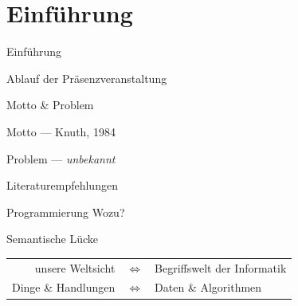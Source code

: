 \section{Einführung}\label{sec:0-einfuehrung}
\begin{frame}{Einführung}
\end{frame}

\begin{frame}{Ablauf der Präsenzveranstaltung}
\end{frame}

\begin{frame}{Motto \& Problem}
    \begin{block}{Motto}
         --- Knuth, 1984
    \end{block}
    \begin{block}{Problem}
         --- \emph{unbekannt}
    \end{block}    
\end{frame}

\begin{frame}{Literaturempfehlungen}
    \nocite{*}
    \printbibliography
\end{frame}

\begin{frame}{Programmierung Wozu?}
    \begin{block}{Semantische Lücke}
        \begin{tabular}{rcl}
            unsere Weltsicht&$\Leftrightarrow$&Begriffswelt der Informatik\\
            Dinge \& Handlungen&$\Leftrightarrow$&Daten \& Algorithmen
        \end{tabular}
    \end{block}
\end{frame}

